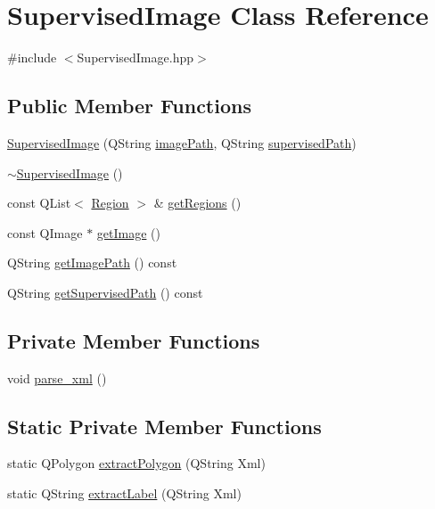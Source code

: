 \hypertarget{class_supervised_image}{\section{Supervised\+Image Class Reference}
\label{class_supervised_image}
}


{\ttfamily \#include $<$Supervised\+Image.\+hpp$>$}

\subsection*{Public Member Functions}
\begin{DoxyCompactItemize}
\item 
\hyperlink{class_supervised_image_a032c9ef022d741cfb65c683ed11029ed}{Supervised\+Image} (Q\+String \hyperlink{class_supervised_image_a39f8b0212d2dae489d7b060b0d8dd1b9}{image\+Path}, Q\+String \hyperlink{class_supervised_image_aeeb634f3804dffba600e6aea71fc353e}{supervised\+Path})
\item 
\hyperlink{class_supervised_image_a4e9cb98175c10635ff6b4aedb578d70e}{$\sim$\+Supervised\+Image} ()
\item 
const Q\+List$<$ \hyperlink{class_region}{Region} $>$ \& \hyperlink{class_supervised_image_a19120479bf06cc96df0eb2aea5f0e205}{get\+Regions} ()
\item 
const Q\+Image $\ast$ \hyperlink{class_supervised_image_a0a87d87ce7a8f21f5269f29e0d637290}{get\+Image} ()
\item 
Q\+String \hyperlink{class_supervised_image_af3c35e83075edcb7ca58bd708b198a4b}{get\+Image\+Path} () const 
\item 
Q\+String \hyperlink{class_supervised_image_a7accd41406835fc82dbeaf783ab2acaf}{get\+Supervised\+Path} () const 
\end{DoxyCompactItemize}
\subsection*{Private Member Functions}
\begin{DoxyCompactItemize}
\item 
void \hyperlink{class_supervised_image_ae351771d19a2bbd53c88e871ed5bb4de}{parse\+\_\+xml} ()
\end{DoxyCompactItemize}
\subsection*{Static Private Member Functions}
\begin{DoxyCompactItemize}
\item 
static Q\+Polygon \hyperlink{class_supervised_image_aaeaaf36c52ed6317d547461d39a57b4e}{extract\+Polygon} (Q\+String Xml)
\item 
static Q\+String \hyperlink{class_supervised_image_af603900bba42552e5d8395a5a265907a}{extract\+Label} (Q\+String Xml)
\end{DoxyCompactItemize}
